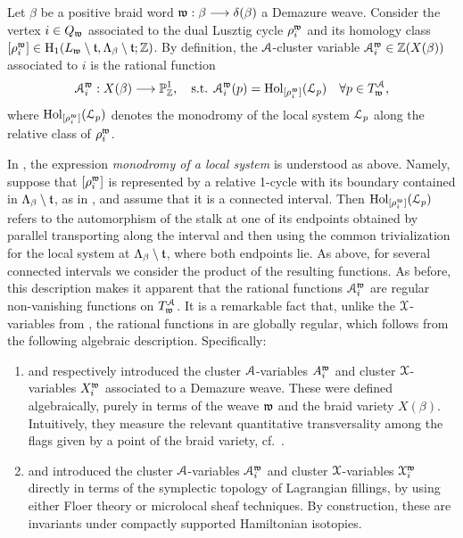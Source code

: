 \begin{fdef}\label{def:Avariables_via_fillings}
Let $\beta$ be a positive braid word $\mathfrak{w}:\beta\longrightarrow\delta(\beta)$ a Demazure weave. Consider the vertex $i\in Q_{\mathfrak{w}}$ associated to the dual Lusztig cycle $\rho_i^{\mathfrak{w}}$ and its homology class $[\rho_i^{\mathfrak{w}}]\in \operatorname{H}_1(L_{\mathfrak{w}}\setminus\mathfrak{t},\Lambda_\beta\setminus\mathfrak{t};\mathbb{Z})$. By definition, the $\mathcal{A}$-cluster variable $\mathcal{A}_i^{\mathfrak{w}}\in \mathbb{Z}(X(\beta))$ associated to $i$ is the rational function
\begin{equation}\label{eq:Avariable_via_fillings}
\mathcal{A}_i^{\mathfrak{w}}:X(\beta)\longrightarrow\mathbb{P}^1_{\mathbb{Z}},\quad\mbox{s.t. } \mathcal{A}_i^{\mathfrak{w}}(p)=\operatorname{Hol}_{[\rho_i^{\mathfrak{w}}]}(\mathcal{L}_p)\quad\forall p\in T^{\mathcal{A}}_{\mathfrak{w}},
\end{equation}
where $\operatorname{Hol}_{[\rho_i^{\mathfrak{w}}]}(\mathcal{L}_p)$ denotes the monodromy of the local system $\mathcal{L}_p$ along the relative class of $\rho_i^{\mathfrak{w}}$.\sbs
\end{fdef}
\vspace{0.2cm}
In , the expression {\it monodromy of a local system} is understood as above. Namely, suppose that $[\rho_i^{\mathfrak{w}}]$ is represented by a relative 1-cycle with its boundary contained in $\Lambda_\beta\setminus\mathfrak{t}$, as in , and assume that it is a connected interval. Then $\operatorname{Hol}_{[\rho_i^{\mathfrak{w}}]}(\mathcal{L}_p)$ refers to the automorphism of the stalk at one of its endpoints obtained by parallel transporting along the interval and then using the common trivialization for the local system at $\Lambda_\beta\setminus\mathfrak{t}$, where both endpoints lie. As above, for several connected intervals we consider the product of the resulting functions. As before, this description makes it apparent that the rational functions $\mathcal{A}_i^{\mathfrak{w}}$ are regular non-vanishing functions on $T_{\mathfrak{w}}^{\mathcal{A}}$. It is a remarkable fact that, unlike the $\mathcal{X}$-variables from , the rational functions in  are globally regular, which follows from the following algebraic description. Specifically:

\begin{enumerate}
    \item {} and  respectively introduced the cluster $\mathcal{A}$-variables $A_i^{\mathfrak{w}}$ and cluster $\mathcal{X}$-variables $X_i^{\mathfrak{w}}$ associated to a Demazure weave. These were defined algebraically, purely in terms of the weave $\mathfrak{w}$ and the braid variety $X(\beta)$. Intuitively, they measure the relevant quantitative transversality among the flags given by a point of the braid variety, cf.~.\\

    \item {} and  introduced the cluster $\mathcal{A}$-variables $\mathcal{A}_i^{\mathfrak{w}}$ and cluster $\mathcal{X}$-variables $\mathcal{X}_i^{\mathfrak{w}}$ directly in terms of the symplectic topology of Lagrangian fillings, by using either Floer theory or microlocal sheaf techniques. By construction, these are invariants under compactly supported Hamiltonian isotopies.\\
\end{enumerate}

